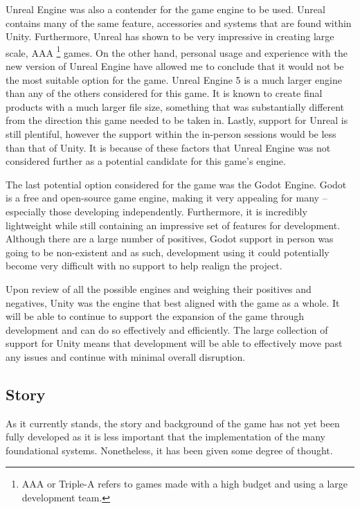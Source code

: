 \documentclass[11pt]{article}
\begin{document}
Unreal Engine was also a contender for the game engine to be used. Unreal contains many of the same
feature, accessories and systems that are found within Unity. Furthermore, Unreal has shown to be
very impressive in creating large scale, AAA \footnote{AAA or Triple-A refers to games made with a
high budget and using a large development team.} games. On the other hand, personal usage and
experience with the new version of Unreal Engine have allowed me to conclude that it would not be
the most suitable option for the game. Unreal Engine 5 is a much larger engine than any of the
others considered for this game. It is known to create final products with a much larger file size,
something that was substantially different from the direction this game needed to be taken in.
Lastly, support for Unreal is still plentiful, however the support within the in-person sessions
would be less than that of Unity. It is because of these factors that Unreal Engine was not
considered further as a potential candidate for this game’s engine.

The last potential option considered for the game was the Godot Engine. Godot is a free and
open-source game engine, making it very appealing for many – especially those developing
independently. Furthermore, it is incredibly lightweight while still containing an impressive set
of features for development. Although there are a large number of positives, Godot support in
person was going to be non-existent and as such, development using it could potentially become
very difficult with no support to help realign the project. 

Upon review of all the possible engines and weighing their positives and negatives, Unity was the
engine that best aligned with the game as a whole. It will be able to continue to support the
expansion of the game through development and can do so effectively and efficiently. The large
collection of support for Unity means that development will be able to effectively move past any
issues and continue with minimal overall disruption. \\

\subsection{Story}
As it currently stands, the story and background of the game has not yet been fully developed as it
is less important that the implementation of the many foundational systems. Nonetheless, it has
been given some degree of thought. 
\end{document}
